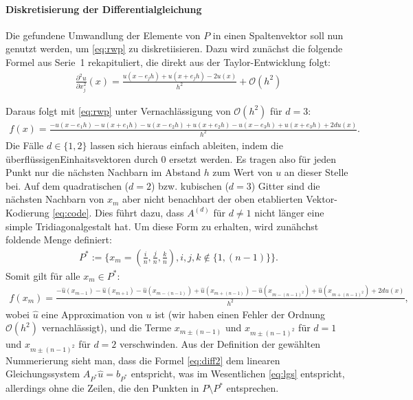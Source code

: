 \documentclass[smallheadings]{scrartcl}
\numberwithin{equation}{section}
\begin{document}
\paragraph{Diskretisierung der Differentialgleichung}
Die gefundene Umwandlung der Elemente von $P$ in einen Spaltenvektor soll nun genutzt werden, um \eqref{eq:rwp} zu diskretiisieren. Dazu wird zunächst die folgende Formel aus Serie~1 rekapituliert, die direkt aus der Taylor-Entwicklung folgt: 
\begin{align}
\frac{\partial^2 u}{\partial x_j^2}(x)=\frac{u(x-e_jh)+u(x+e_jh)-2u(x)}{h^2}+\mathcal{O}(h^2)
\label{eq:diff}
\end{align} 

Daraus folgt mit \eqref{eq:rwp} unter Vernachlässigung von $\mathcal{O}(h^2)$ für $d=3$:
\begin{align}
f(x) = \frac{-u(x-e_1h)-u(x+e_1h)-u(x-e_2h)+u(x+e_2h)-u(x-e_3h)+u(x+e_3h)+2du(x)}{h^2}.
\end{align}
Die Fälle $d\in\{1,2\}$ lassen sich hieraus einfach ableiten, indem die \glqq überflüssigen\grqq Einhaitsvektoren durch $0$ ersetzt werden.
Es tragen also für jeden Punkt nur die nächsten Nachbarn im Abstand $h$ zum Wert von $u$ an dieser Stelle bei. Auf dem quadratischen ($d=2$) bzw. kubischen ($d=3$) Gitter sind die nächsten Nachbarn von $x_m$ aber nicht benachbart der oben etablierten Vektor-Kodierung \eqref{eq:code}. Dies führt dazu, dass $A^{(d)}$ für $d\neq 1$ nicht länger eine simple Tridiagonalgestalt hat. Um diese Form zu erhalten, wird zunähchst foldende Menge definiert:
\begin{align}
P^*:=\lbrace x_m=(\frac{i}{n}, \frac{j}{n}, \frac{k}{n}), i, j, k \notin \lbrace 1, (n-1)\rbrace\rbrace.
\end{align}
Somit gilt für alle $x_m\in P^*$:
\begin{align}
f(x_m) = \frac{-\hat{u}(x_{m-1})-\hat{u}(x_{m+1})-\hat{u}(x_{m-(n-1)})+\hat{u}(x_{m+(n-1)})-\hat{u}(x_{m-(n-1)^2})+\hat{u}(x_{m+(n-1)^2})+2d\hat{u}(x)}{h^2},
\label{eq:diff2}
\end{align}
wobei $\hat{u}$ eine Approximation von $u$ ist (wir haben einen Fehler der Ordnung $\mathcal{O}(h^2)$ vernachlässigt), und die Terme $x_{m\pm(n-1)}$ und $x_{m\pm(n-1)^2}$ für $d=1$ und $x_{m\pm(n-1)^2}$ für $d=2$	verschwinden. Aus der Definition der gewählten Nummerierung sieht man, dass die Formel \eqref{eq:diff2} dem linearen Gleichungssystem $A_{P^*}\hat{u}=b_{P^*}$ entspricht, was im Wesentlichen \eqref{eq:lgs} entspricht, allerdings ohne die Zeilen, die den Punkten in $P\setminus P^*$ entsprechen.
\end{document}
